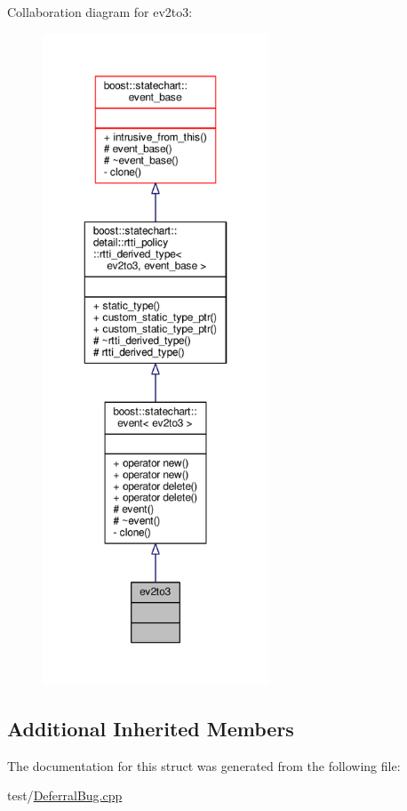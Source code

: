 Collaboration diagram for ev2to3\+:
\nopagebreak
\begin{figure}[H]
\begin{center}
\leavevmode
\includegraphics[height=550pt]{structev2to3__coll__graph}
\end{center}
\end{figure}
\subsection*{Additional Inherited Members}


The documentation for this struct was generated from the following file\+:\begin{DoxyCompactItemize}
\item 
test/\mbox{\hyperlink{_deferral_bug_8cpp}{Deferral\+Bug.\+cpp}}\end{DoxyCompactItemize}
